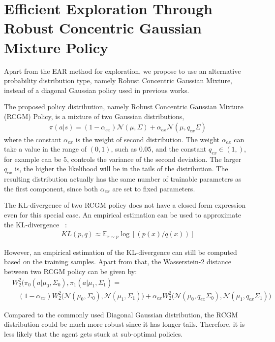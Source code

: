 \section{Efficient Exploration Through Robust Concentric Gaussian Mixture Policy}
Apart from the EAR method for exploration, we propose to use an alternative probability distribution type, namely Robust Concentric Gaussian Mixture, instead of a diagonal Gaussian policy used in previous works.

The proposed policy distribution, namely Robust Concentric Gaussian Mixture (RCGM) Policy, is a mixture of two Gaussian distributions,
\begin{align}
\pi (a|s) = (1-\alpha_{ex})\mathcal{N}(\mu,\Sigma) + \alpha_{ex} \mathcal{N}(\mu,q_{ex}\Sigma)
\end{align}
where the constant $\alpha_{ex}$ is the weight of second distribution. The weight $\alpha_{ex}$ can take a value in the range of $(0,1)$, such as $0.05$, and the constant $q_{ex} \in (1,)$, for example can be $5$, controls the variance of the second deviation. The larger $q_{ex}$ is, the higher the likelihood will be in the tails of the distribution. The resulting distribution actually has the same number of trainable parameters as the first component, since both $\alpha_{ex}$ are set to fixed parameters.

The KL-divergence of two RCGM policy does not have a closed form expression even for this special case. An empirical estimation can be used to approximate the KL-divergence ~\cite{hershey2007approximat}:%
\begin{align}
KL(p, q) \approx\mathbb{E}_{x\sim p} \log [ \left(p(x)/q(x)\right) ]
\end{align}

However, an empirical estimation of the KL-divergence can still be computed based on the training samples. Apart from that, the Wasserstein-2 distance between two RCGM policy can be given by:
\begin{align}&W_2^2(\pi_{0}(a|\mu_0,\Sigma_0), \pi_{1}(a|\mu_1,\Sigma_1) =  \\ \nonumber
& \ \ \ \ (1-\alpha_{ex})
W_2^2\big(\mathcal{N}(\mu_0,\Sigma_0), \mathcal{N}(\mu_1,\Sigma_1)\big)
+ \alpha_{ex} W_2^2\big(\mathcal{N}(\mu_0,q_{ex}\Sigma_0), \mathcal{N}(\mu_1,q_{ex}\Sigma_1)\big)
\end{align}


Compared to the commonly used Diagonal Gaussian distribution, the RCGM distribution could be much more robust since it has longer tails. Therefore, it is less likely that the agent gets stuck at sub-optimal policies.

